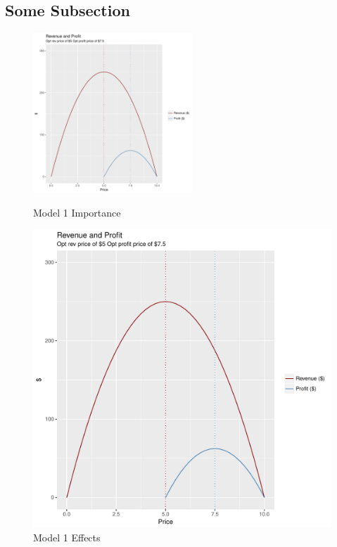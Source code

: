 \documentclass{report}\usepackage[]{graphicx}\usepackage[]{color}
\begin{document}
\subsection{Some Subsection}


\blindtext

\begin{figure}[ !htb]
  \includegraphics[width=\linewidth,height = 6cm]{optprice.pdf}
  \caption{Model 1 Importance}\label{fig:awesome_image1}
\endminipage\hfill
{}
  \includegraphics[width=\linewidth]{optprice.pdf}
  \caption{Model 1 Effects}\label{fig:awesome_image2}
\endminipage\hfill

\end{figure}


\blindtext
\end{document}
